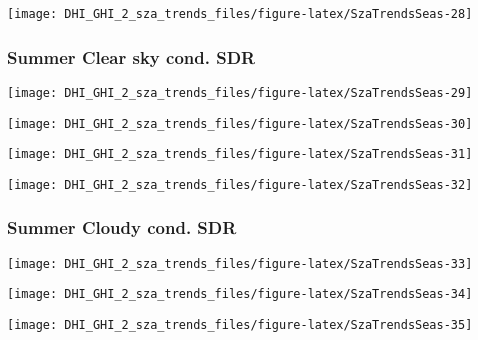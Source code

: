 \documentclass[
  10pt,
  a4paper,oneside]{article}
\begin{document}
\begin{center}\texttt{[image: DHI\_GHI\_2\_sza\_trends\_files/figure-latex/SzaTrendsSeas-28]} \end{center}

\newpage

\hypertarget{summer-clear-sky-cond.-sdr}{%
\subsubsection{Summer Clear sky cond. SDR}\label{summer-clear-sky-cond.-sdr}}

\begin{center}\texttt{[image: DHI\_GHI\_2\_sza\_trends\_files/figure-latex/SzaTrendsSeas-29]} \end{center}

\begin{center}\texttt{[image: DHI\_GHI\_2\_sza\_trends\_files/figure-latex/SzaTrendsSeas-30]} \end{center}

\begin{center}\texttt{[image: DHI\_GHI\_2\_sza\_trends\_files/figure-latex/SzaTrendsSeas-31]} \end{center}

\begin{center}\texttt{[image: DHI\_GHI\_2\_sza\_trends\_files/figure-latex/SzaTrendsSeas-32]} \end{center}

\newpage

\hypertarget{summer-cloudy-cond.-sdr}{%
\subsubsection{Summer Cloudy cond. SDR}\label{summer-cloudy-cond.-sdr}}

\begin{center}\texttt{[image: DHI\_GHI\_2\_sza\_trends\_files/figure-latex/SzaTrendsSeas-33]} \end{center}

\begin{center}\texttt{[image: DHI\_GHI\_2\_sza\_trends\_files/figure-latex/SzaTrendsSeas-34]} \end{center}

\begin{center}\texttt{[image: DHI\_GHI\_2\_sza\_trends\_files/figure-latex/SzaTrendsSeas-35]} \end{center}
\end{document}

